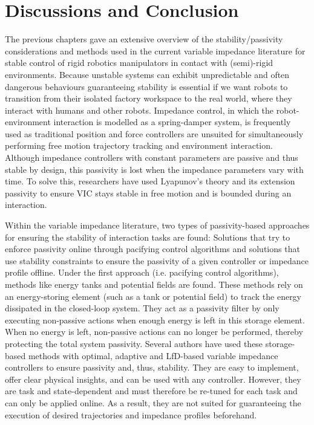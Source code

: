 \chapter{Discussions and Conclusion}
\label{chapter:conclusion}

The previous chapters gave an extensive overview of the stability/passivity considerations and methods used in the current variable impedance literature for stable control of rigid robotics manipulators in contact with (semi)-rigid environments. Because unstable systems can exhibit unpredictable and often dangerous behaviours guaranteeing stability is essential if we want robots to transition from their isolated factory workspace to the real world, where they interact with humans and other robots. Impedance control, in which the robot-environment interaction is modelled as a spring-damper system, is frequently used as traditional position and force controllers are unsuited for simultaneously performing free motion trajectory tracking and environment interaction. Although impedance controllers with constant parameters are passive and thus stable by design, this passivity is lost when the impedance parameters vary with time. To solve this, researchers have used Lyapunov's theory and its extension passivity to ensure VIC stays stable in free motion and is bounded during an interaction.

Within the variable impedance literature, two types of passivity-based approaches for ensuring the stability of interaction tasks are found: Solutions that try to enforce passivity online through pacifying control algorithms and solutions that use stability constraints to ensure the passivity of a given controller or impedance profile offline. Under the first approach (i.e. pacifying control algorithms), methods like energy tanks and potential fields are found. These methods rely on an energy-storing element (such as a tank or potential field) to track the energy dissipated in the closed-loop system. They act as a passivity filter by only executing non-passive actions when enough energy is left in this storage element. When no energy is left, non-passive actions can no longer be performed, thereby protecting the total system passivity. Several authors have used these storage-based methods with optimal, adaptive and LfD-based variable impedance controllers to ensure passivity and, thus, stability. They are easy to implement, offer clear physical insights, and can be used with any controller. However, they are task and state-dependent and must therefore be re-tuned for each task and can only be applied online. As a result, they are not suited for guaranteeing the execution of desired trajectories and impedance profiles beforehand. 

